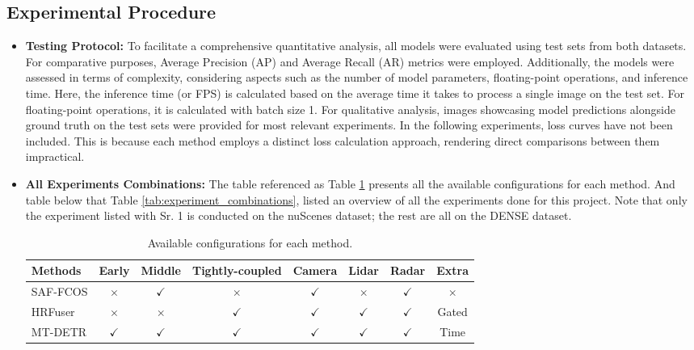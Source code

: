 \documentclass[report.tex]{subfiles}
\begin{document}
        

        
        \subsection{Experimental Procedure}
        \begin{itemize}
            \item \textbf{Testing Protocol:} To facilitate a comprehensive quantitative analysis, all models were evaluated using test sets from both datasets. For comparative purposes, Average Precision (AP) and Average Recall (AR) metrics were employed. Additionally, the models were assessed in terms of complexity, considering aspects such as the number of model parameters, floating-point operations, and inference time. Here, the inference time (or FPS) is calculated based on the average time it takes to process a single image on the test set. For floating-point operations, it is calculated with batch size 1. For qualitative analysis, images showcasing model predictions alongside ground truth on the test sets were provided for most relevant experiments. In the following experiments, loss curves have not been included. This is because each method employs a distinct loss calculation approach, rendering direct comparisons between them impractical.
            \item \textbf{All Experiments Combinations:} The table referenced as Table \ref{tab:total_available_configurations} presents all the available configurations for each method. And table below that Table \ref{tab:experiment_combinations}, listed an overview of all the experiments done for this project. Note that only the experiment listed with Sr. 1 is conducted on the nuScenes dataset; the rest are all on the DENSE dataset.

            \begin{table}[h!]
                \centering
                \caption{Available configurations for each method.}
                \begin{tabular}{|l|c|c|c|c|c|c|c|}
                \hline
                \textbf{Methods} & \textbf{Early} & \textbf{Middle} & \textbf{Tightly-coupled} & \textbf{Camera} & \textbf{Lidar} & \textbf{Radar} & \textbf{Extra} \\ \hline
                SAF-FCOS & $\times$ & $\checkmark$ & $\times$ & $\checkmark$ & $\times$ & $\checkmark$ & $\times$ \\ \hline
                HRFuser & $\times$ & $\times$ & $\checkmark$ & $\checkmark$ & $\checkmark$ & $\checkmark$ & Gated \\ \hline
                MT-DETR & $\checkmark$ & $\checkmark$ & $\checkmark$ & $\checkmark$ & $\checkmark$ & $\checkmark$ & Time \\ \hline
                \end{tabular}
                \label{tab:total_available_configurations}
            \end{table}
            


\end{itemize}
\end{document}
